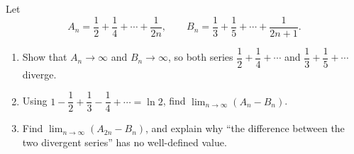 Let
\[
A_n=\dfrac{1}{2}+\dfrac{1}{4}+\cdots+\dfrac{1}{2n},\qquad B_n=\dfrac{1}{3}+\dfrac{1}{5}+\cdots+\dfrac{1}{2n+1}.
\]
\begin{enumerate}
\item[(a)] Show that $A_n\to\infty$ and $B_n\to\infty$, so both series $\dfrac{1}{2}+\dfrac{1}{4}+\cdots$ and $\dfrac{1}{3}+\dfrac{1}{5}+\cdots$ diverge.
\item[(b)] Using $1-\dfrac{1}{2}+\dfrac{1}{3}-\dfrac{1}{4}+\cdots=\ln2$, find $\displaystyle\lim_{n\to\infty}(A_n-B_n)$.
\item[(c)] Find $\displaystyle\lim_{n\to\infty}(A_{2n}-B_n)$, and explain why ``the difference between the two divergent series'' has no well-defined value.
\end{enumerate}
